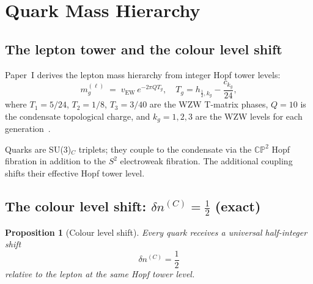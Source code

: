 \documentclass[11pt,a4paper]{article}
\newtheorem{proposition}[theorem]{Proposition}
\theoremstyle{definition}
\theoremstyle{remark}
\begin{document}
\section{Quark Mass Hierarchy}
\label{P5:sec:quarks}

\subsection{The lepton tower and the colour level shift}

Paper~I derives the lepton mass hierarchy from integer Hopf tower levels:
\begin{equation}
  m_g^{(\ell)} \;=\; v_{\mathrm{EW}}\,e^{-2\pi Q T_g},
  \quad
  T_g = h_{\frac{1}{2},k_g} - \frac{c_{k_g}}{24},
  \label{P5:eq:lepton_mass}
\end{equation}
where $T_1=5/24$, $T_2=1/8$, $T_3=3/40$ are the WZW T-matrix phases,
$Q=10$ is the condensate topological charge, and $k_g=1,2,3$ are
the WZW levels for each generation~\cite{Paper1}.

Quarks are SU(3)$_C$ triplets; they couple to the condensate via
the $\mathbb{CP}^2$ Hopf fibration in addition to the $S^2$
electroweak fibration.  The additional coupling shifts their
effective Hopf tower level.

\subsection{The colour level shift: $\delta n^{(C)} = \tfrac{1}{2}$ (exact)}

\begin{proposition}[Colour level shift]
\label{P5:prop:colour_shift}
Every quark receives a universal half-integer shift
\begin{equation}
  \delta n^{(C)} = \frac{1}{2}
  \label{P5:eq:dncol_exact}
\end{equation}
relative to the lepton at the same Hopf tower level.
\end{proposition}
\end{document}
